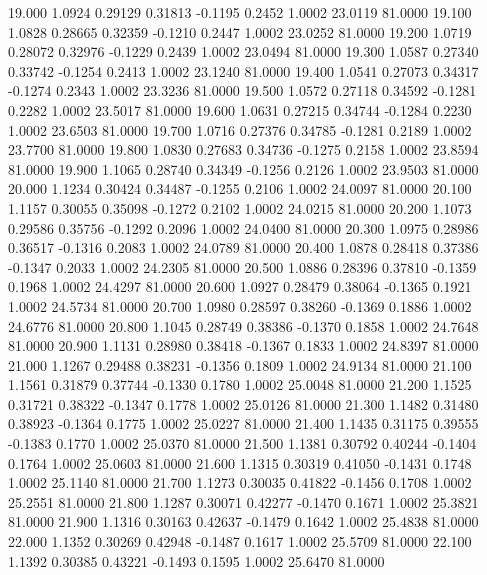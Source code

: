  19.000   1.0924   0.29129   0.31813  -0.1195   0.2452   1.0002  23.0119  81.0000
  19.100   1.0828   0.28665   0.32359  -0.1210   0.2447   1.0002  23.0252  81.0000
  19.200   1.0719   0.28072   0.32976  -0.1229   0.2439   1.0002  23.0494  81.0000
  19.300   1.0587   0.27340   0.33742  -0.1254   0.2413   1.0002  23.1240  81.0000
  19.400   1.0541   0.27073   0.34317  -0.1274   0.2343   1.0002  23.3236  81.0000
  19.500   1.0572   0.27118   0.34592  -0.1281   0.2282   1.0002  23.5017  81.0000
  19.600   1.0631   0.27215   0.34744  -0.1284   0.2230   1.0002  23.6503  81.0000
  19.700   1.0716   0.27376   0.34785  -0.1281   0.2189   1.0002  23.7700  81.0000
  19.800   1.0830   0.27683   0.34736  -0.1275   0.2158   1.0002  23.8594  81.0000
  19.900   1.1065   0.28740   0.34349  -0.1256   0.2126   1.0002  23.9503  81.0000
  20.000   1.1234   0.30424   0.34487  -0.1255   0.2106   1.0002  24.0097  81.0000
  20.100   1.1157   0.30055   0.35098  -0.1272   0.2102   1.0002  24.0215  81.0000
  20.200   1.1073   0.29586   0.35756  -0.1292   0.2096   1.0002  24.0400  81.0000
  20.300   1.0975   0.28986   0.36517  -0.1316   0.2083   1.0002  24.0789  81.0000
  20.400   1.0878   0.28418   0.37386  -0.1347   0.2033   1.0002  24.2305  81.0000
  20.500   1.0886   0.28396   0.37810  -0.1359   0.1968   1.0002  24.4297  81.0000
  20.600   1.0927   0.28479   0.38064  -0.1365   0.1921   1.0002  24.5734  81.0000
  20.700   1.0980   0.28597   0.38260  -0.1369   0.1886   1.0002  24.6776  81.0000
  20.800   1.1045   0.28749   0.38386  -0.1370   0.1858   1.0002  24.7648  81.0000
  20.900   1.1131   0.28980   0.38418  -0.1367   0.1833   1.0002  24.8397  81.0000
  21.000   1.1267   0.29488   0.38231  -0.1356   0.1809   1.0002  24.9134  81.0000
  21.100   1.1561   0.31879   0.37744  -0.1330   0.1780   1.0002  25.0048  81.0000
  21.200   1.1525   0.31721   0.38322  -0.1347   0.1778   1.0002  25.0126  81.0000
  21.300   1.1482   0.31480   0.38923  -0.1364   0.1775   1.0002  25.0227  81.0000
  21.400   1.1435   0.31175   0.39555  -0.1383   0.1770   1.0002  25.0370  81.0000
  21.500   1.1381   0.30792   0.40244  -0.1404   0.1764   1.0002  25.0603  81.0000
  21.600   1.1315   0.30319   0.41050  -0.1431   0.1748   1.0002  25.1140  81.0000
  21.700   1.1273   0.30035   0.41822  -0.1456   0.1708   1.0002  25.2551  81.0000
  21.800   1.1287   0.30071   0.42277  -0.1470   0.1671   1.0002  25.3821  81.0000
  21.900   1.1316   0.30163   0.42637  -0.1479   0.1642   1.0002  25.4838  81.0000
  22.000   1.1352   0.30269   0.42948  -0.1487   0.1617   1.0002  25.5709  81.0000
  22.100   1.1392   0.30385   0.43221  -0.1493   0.1595   1.0002  25.6470  81.0000
